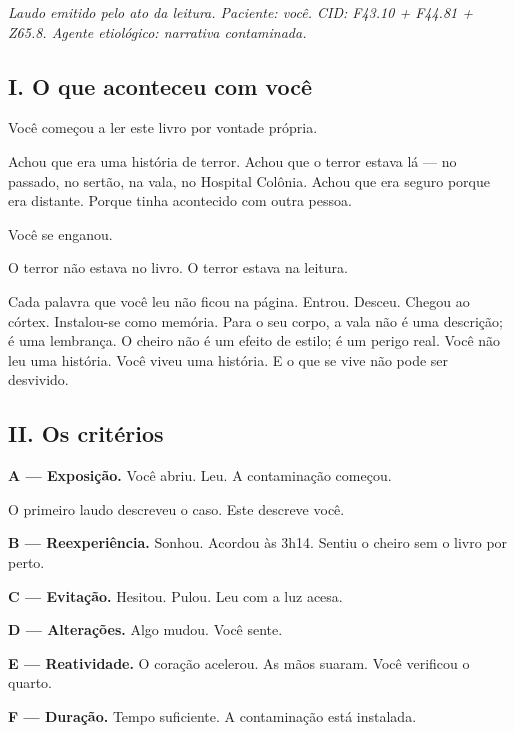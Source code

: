 
\noindent \textit{Laudo emitido pelo ato da leitura. Paciente: você. CID: F43.10 + F44.81 + Z65.8. Agente etiológico: narrativa contaminada.}

\subsection*{I. O que aconteceu com você}

\noindent Você começou a ler este livro por vontade própria.

\noindent Achou que era uma história de terror. Achou que o terror estava lá --- no passado, no sertão, na vala, no Hospital Colônia. Achou que era seguro porque era distante. Porque tinha acontecido com outra pessoa.

\noindent Você se enganou.

\noindent O terror não estava no livro. O terror estava na leitura.

\noindent Cada palavra que você leu não ficou na página. Entrou. Desceu. Chegou ao córtex. Instalou-se como memória. Para o seu corpo, a vala não é uma descrição; é uma lembrança. O cheiro não é um efeito de estilo; é um perigo real. Você não leu uma história. Você viveu uma história. E o que se vive não pode ser desvivido.

\subsection*{II. Os critérios}

\noindent \textbf{A --- Exposição.} Você abriu. Leu. A contaminação começou.

\noindent O primeiro laudo descreveu o caso. Este descreve você.

\noindent \textbf{B --- Reexperiência.} Sonhou. Acordou às 3h14. Sentiu o cheiro sem o livro por perto.

\noindent \textbf{C --- Evitação.} Hesitou. Pulou. Leu com a luz acesa.

\noindent \textbf{D --- Alterações.} Algo mudou. Você sente.

\noindent \textbf{E --- Reatividade.} O coração acelerou. As mãos suaram. Você verificou o quarto.

\noindent \textbf{F --- Duração.} Tempo suficiente. A contaminação está instalada.

